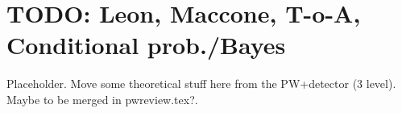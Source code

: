 \section{TODO: Leon, Maccone, T-o-A, Conditional prob./Bayes}

Placeholder. Move some theoretical stuff here from the PW+detector (3 level).
Maybe to be merged in pwreview.tex?.